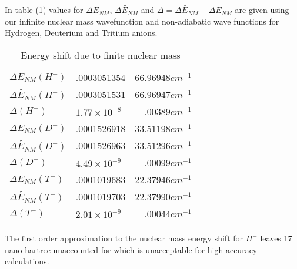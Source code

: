 \documentclass[12pt,thmsa]{article}
\begin{document}
In table (\ref{NMtab}) values for $\Delta E_{NM}$, $\widetilde{\Delta E_{NM}}
$ and $\Delta =\widetilde{\Delta E_{NM}}-\Delta E_{NM}$ are given using our
infinite nuclear mass wavefunction and non-adiabatic wave functions for
Hydrogen, Deuterium and Tritium anions.

\begin{table}[tbp] \centering%
\begin{tabular}{lll}
\hline\hline
$\Delta E_{NM}\left( H^{-}\right) $ & .0003051354 & 66.96948$cm^{-1}$ \\ 
$\widetilde{\Delta E_{NM}}\left( H^{-}\right) $ & .0003051531 & 
\multicolumn{1}{r}{66.96947$cm^{-1}$} \\ 
$\Delta \left( H^{-}\right) $ & $1.77\times 10^{-8}$ & \multicolumn{1}{r}{
.00389$cm^{-1}$} \\ \hline
$\Delta E_{NM}\left( D^{-}\right) $ & .0001526918 & \multicolumn{1}{r}{
33.51198$cm^{-1}$} \\ 
$\widetilde{\Delta E_{NM}}\left( D^{-}\right) $ & .0001526963 & 
\multicolumn{1}{r}{33.51296$cm^{-1}$} \\ 
$\Delta \left( D^{-}\right) $ & $4.49\times 10^{-9}$ & \multicolumn{1}{r}{
.00099$cm^{-1}$} \\ \hline
$\Delta E_{NM}\left( T^{-}\right) $ & .0001019683 & \multicolumn{1}{r}{
22.37946$cm^{-1}$} \\ 
$\widetilde{\Delta E_{NM}}\left( T^{-}\right) $ & .0001019703 & 
\multicolumn{1}{r}{22.37990$cm^{-1}$} \\ 
$\Delta \left( T^{-}\right) $ & $2.01\times 10^{-9}$ & \multicolumn{1}{r}{
.00044$cm^{-1}$} \\ \hline\hline
\end{tabular}
\caption{Energy shift due to finite nuclear mass\label{NMtab}}%
\end{table}%
The first order approximation to the nuclear mass energy shift for $H^{-}$
leaves 17 nano-hartree unaccounted for which is unacceptable for high
accuracy calculations.
\end{document}
